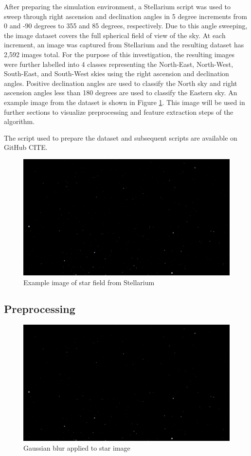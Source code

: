 \documentclass[10pt,twocolumn,letterpaper]{article}
\begin{document}
After preparing the simulation environment, a Stellarium script was used to sweep through right ascension and declination angles in 5 degree increments from 0 and -90 degrees to 355 and 85 degrees, respectively. Due to this angle sweeping, the image dataset covers the full spherical field of view of the sky. At each increment, an image was captured from Stellarium and the resulting dataset has 2,592 images total. For the purpose of this investigation, the resulting images were further labelled into 4 classes representing the North-East, North-West, South-East, and South-West skies using the right ascension and declination angles. Positive declination angles are used to classify the North sky and right ascension angles less than 180 degrees are used to classify the Eastern sky. An example image from the dataset is shown in Figure \ref{fig:star_img}. This image will be used in further sections to visualize preprocessing and feature extraction steps of the algorithm.

The script used to prepare the dataset and subsequent scripts are available on GitHub CITE.

\begin{figure}[H]
  \centering
   \includegraphics[width=0.9\linewidth]{stars_000}
   \caption{Example image of star field from Stellarium}
   \label{fig:star_img}
\end{figure}

\subsection{Preprocessing}

\begin{figure}[H]
  \centering
   \includegraphics[width=0.9\linewidth]{gauss}
   \caption{Gaussian blur applied to star image}
   \label{fig:star_gauss}
\end{figure}
\end{document}
